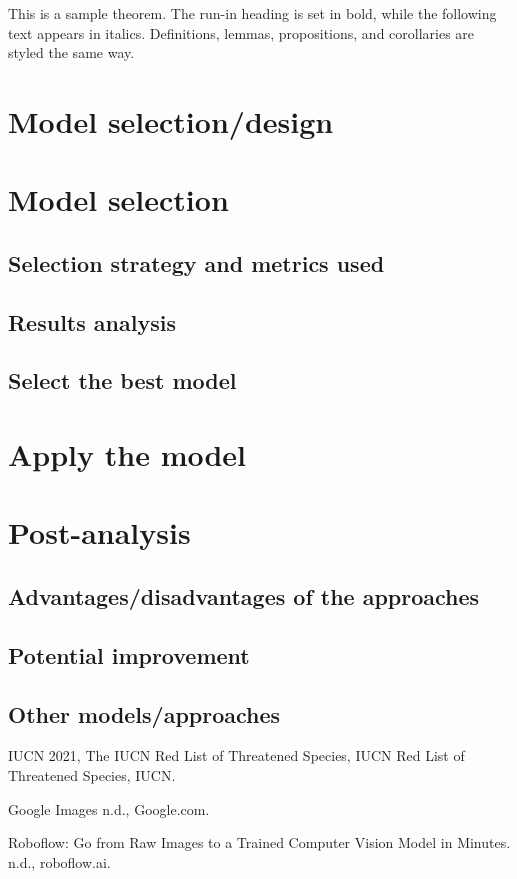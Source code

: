 \documentclass[runningheads]{llncs}
\begin{document}
\begin{theorem}
This is a sample theorem. The run-in heading is set in bold, while
the following text appears in italics. Definitions, lemmas,
propositions, and corollaries are styled the same way.
\end{theorem}

\section{Model selection/design}

\section{Model selection}
\subsection{Selection strategy and metrics used}
\subsection{Results analysis}
\subsection{Select the best model}
\section{Apply the model}
\section{Post-analysis}
\subsection{Advantages/disadvantages of the approaches}
\subsection{Potential improvement}
\subsection{Other models/approaches}


\begin{thebibliography}{8}
IUCN 2021, The IUCN Red List of Threatened Species, IUCN Red List of Threatened Species, IUCN.

Google Images n.d., Google.com.

Roboflow: Go from Raw Images to a Trained Computer Vision Model in Minutes. n.d., roboflow.ai.

\end{thebibliography}
\end{document}
